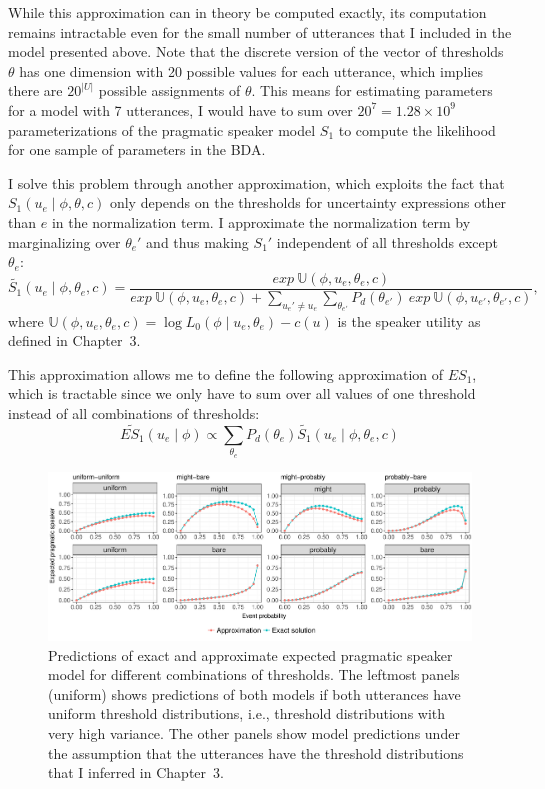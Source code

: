 While this approximation can in theory be computed exactly, its computation remains intractable even 
for the small number of utterances that I included in the model presented above. Note that the discrete version of the
vector of thresholds $\theta$ has one dimension with 20 possible values for each utterance, which implies
there are $20^{|U|}$ possible assignments of $\theta$. This means for estimating parameters for 
a model with 7 utterances, I would have to sum over $20^{7}=1.28 \times 10^9$ 
parameterizations of the pragmatic speaker model $S_1$ to compute the likelihood for one 
sample of parameters in the BDA. 

I solve this problem through another approximation, which exploits the fact that 
$S_1(u _e \mid \phi, \theta, c)$ only depends on the thresholds for uncertainty
expressions other than $e$ in the normalization term. I approximate the normalization term by 
marginalizing over $\theta_e'$ and thus making $S_1'$ independent of all thresholds except $\theta_e$:
$$\widetilde{S_1}(u_e \mid \phi, \theta_e, c) = \frac{exp \ \mathbb{U}(\phi, u_e, \theta_e, c) } { exp \ \mathbb{U}(\phi, u_e, \theta_e, c) + 
\sum_{u_e' \ne u_e}{ \sum_{\theta_{e'}} P_d(\theta_{e'}) \  exp \ \mathbb{U}(\phi, u_{e'}, \theta_{e'}, c) } }, $$
where $\mathbb{U}(\phi, u_e, \theta_e, c) = \log L_0(\phi \mid u_e, \theta_e) - c(u) $ is the speaker utility as defined in Chapter~3.



This approximation allows me to define the following approximation of $ES_1$, which is tractable since we only have to sum over
all values of one threshold instead of all combinations of thresholds:
$$\widetilde{ES_1}(u_e \mid \phi) \propto  \sum_{\theta_e} P_{d}(\theta_e) \widetilde{S_1}\left(u _e\mid \phi, \theta_e, c\right)$$

\begin{figure}[h!]
\includegraphics[width=\textwidth]{plots/fig-C1-approx-simulations.pdf}
\caption{Predictions of exact and approximate expected pragmatic speaker model for different combinations of thresholds. The leftmost panels (uniform) shows predictions of both models if both utterances have uniform threshold distributions, i.e., threshold distributions with very high variance. The other panels show model predictions under the assumption that the utterances have the threshold distributions that I inferred in Chapter~3. \label{fig:approx-simulations}}
\end{figure}

